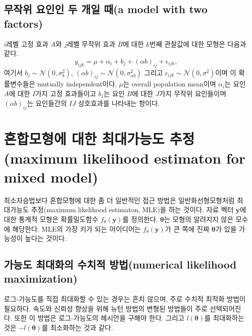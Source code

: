 \documentclass[b5paper,]{scrbook}
\theoremstyle{plain}
\theoremstyle{definition}
\numberwithin{equation}{section}
\begin{document}
\hypertarget{----a-model-with-two-factors}{%
\subsection{무작위 요인인 두 개일 때(a model with two factors)}\label{----a-model-with-two-factors}}

\(i\)레벨 고정 효과 \(A\)와 \(j\)레벨 무작위 효과 \(B\)에 대한 \(k\)번째 관찰값에 대한 모형은 다음과 같다.
\[y_{ijk} = \mu + \alpha_{i} + b_{j} + (\alpha b)_{ij} + \epsilon_{ijk},\]
여기서 \(b_{j}\sim \mathcal{N}(0,\sigma_{b}^{2})\), \((\alpha b)_{ij}\sim \mathcal{N}(0,\sigma_{\alpha b}^{2})\) 그리고 \(\epsilon_{ijk}\sim \mathcal{N}(0,\sigma^{2})\)이며 이 확률변수들은 mutually independent이다. \(\mu\)는 overall population mean이며 \(\alpha_{i}\)는 요인 \(A\)에 대한 \(I\)가지 고정 효과들이고 \(b_{j}\)는 요인 \(B\)에 대한 \(J\)가지 무작위 요인들이며 \((\alpha b)_{ij}\)는 요인들간의 \(IJ\) 상호효과를 나타내는 항이다.

\hypertarget{---maximum-likelihood-estimaton-for-mixed-model}{%
\section{혼합모형에 대한 최대가능도 추정(maximum likelihood estimaton for mixed model)}\label{---maximum-likelihood-estimaton-for-mixed-model}}

최소자승법보다 혼합모형에 대한 좀 더 일반적인 접근 방법은 일반화선형모형처럼 최대가능도 추정(maximum likelihood estimaton, MLE)을 하는 것이다. 자료 벡터 \(\mathbf{y}\)에 대한 통계적 모형은 확률밀도함수 \(f_{\theta}(\mathbf{y})\)를 정의한다. \(\boldsymbol{\theta}\)는 모형의 알려지지 않은 모수에 해당한다. MLE의 가장 키가 되는 아이디어는 \(f_{\theta}(\mathbf{y})\)가 큰 쪽에 진짜 \(\boldsymbol{\theta}\)가 있을 가능성이 높다는 것이다.

\hypertarget{---numerical-likelihood-maximization}{%
\subsection{가능도 최대화의 수치적 방법(numerical likelihood maximization)}\label{---numerical-likelihood-maximization}}

로그-가능도를 직접 최대화할 수 있는 경우는 흔치 않으며, 주로 수치적 최적화 방법이 필요하다. 속도와 신뢰성 향상을 위해 뉴턴 방법의 변형된 방법들이 주로 선택되어진다. 또한 이 방법은 로그-가능도의 헤시안을 구해야 한다. 그리고 \(l(\boldsymbol{\theta})\)를 최대화하는 것은 \(-l(\boldsymbol{\theta})\)를 최소화하는 것과 같다.
\end{document}
